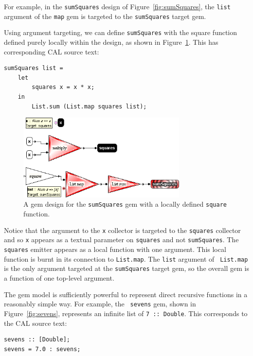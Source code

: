 \documentclass[preprint]{sigplanconf}
\begin{document}
For example, in the {\tt sumSquares} design of Figure~\ref{fig:sumSquares}, the {\tt list} argument
of the {\tt map} gem is targeted to the {\tt sumSquares} target gem.

Using argument targeting, we can define {\tt sumSquares} with the
square function defined purely locally within the design, as shown in
Figure~\ref{fig:sumSquaresWithLocalSquare}.
This has corresponding CAL source text:
\begin{verbatim}
sumSquares list = 
    let
        squares x = x * x;
    in
        List.sum (List.map squares list);
\end{verbatim}

\begin{figure}[htb]
  \centering
  \includegraphics[width=20pc]{sumSquaresWithLocalSquare.png}
  \caption{A gem design for the {\tt sumSquares} gem with a locally defined {\tt square} function.}
  \label{fig:sumSquaresWithLocalSquare}
\end{figure}

Notice that the argument to the {\tt x} collector is targeted to the
{\tt squares} collector and so {\tt x} appears as a textual parameter on
{\tt squares} and not {\tt sumSquares}.  The {\tt squares} emitter appears
as a local function with one argument. This local function is burnt in
its connection to {\tt List.map}. The {\tt list} argument of {\tt
List.map} is the only argument targeted at the {\tt sumSquares} target gem, so the
overall gem is a function of one top-level argument.

The gem model is sufficiently powerful to represent direct recursive
functions in a reasonably simple way. For example, the {\tt
sevens} gem, shown in Figure~\ref{fig:sevens}, represents an infinite
list of {\tt 7 :: Double}.
This corresponds to the CAL source text:
\begin{verbatim}
sevens :: [Double];
sevens = 7.0 : sevens;
\end{verbatim}
\end{document}
